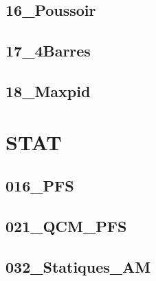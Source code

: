 \subsection{16\_Poussoir}
\graphicspath{{../11-Actions Mécaniques/TD/DYN/TorseurDynamique/STOCK/16_Poussoir/images/}{../11-Actions Mécaniques/TD/DYN/TorseurDynamique/STOCK/16_Poussoir/}{../Style/png/}}


\subsection{17\_4Barres}
\graphicspath{{../11-Actions Mécaniques/TD/DYN/TorseurDynamique/STOCK/17_4Barres/images/}{../11-Actions Mécaniques/TD/DYN/TorseurDynamique/STOCK/17_4Barres/}{../Style/png/}}


\subsection{18\_Maxpid}
\graphicspath{{../11-Actions Mécaniques/TD/DYN/TorseurDynamique/STOCK/18_Maxpid/images/}{../11-Actions Mécaniques/TD/DYN/TorseurDynamique/STOCK/18_Maxpid/}{../Style/png/}}


\section{STAT}

\subsection{016\_PFS}
\graphicspath{{../11-Actions Mécaniques/TD/STAT/016_PFS/images/}{../11-Actions Mécaniques/TD/STAT/016_PFS/}{../Style/png/}}


\subsection{021\_QCM\_PFS}
\graphicspath{{../11-Actions Mécaniques/TD/STAT/021_QCM_PFS/images/}{../11-Actions Mécaniques/TD/STAT/021_QCM_PFS/}{../Style/png/}}


\subsection{032\_Statiques\_AM}
\graphicspath{{../11-Actions Mécaniques/TD/STAT/032_Statiques_AM/images/}{../11-Actions Mécaniques/TD/STAT/032_Statiques_AM/}{../Style/png/}}


